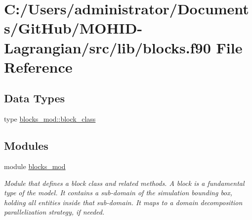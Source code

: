 \hypertarget{blocks_8f90}{}\section{C\+:/\+Users/administrator/\+Documents/\+Git\+Hub/\+M\+O\+H\+I\+D-\/\+Lagrangian/src/lib/blocks.f90 File Reference}
\label{blocks_8f90}
\subsection*{Data Types}
\begin{DoxyCompactItemize}
\item 
type \hyperlink{structblocks__mod_1_1block__class}{blocks\+\_\+mod\+::block\+\_\+class}
\end{DoxyCompactItemize}
\subsection*{Modules}
\begin{DoxyCompactItemize}
\item 
module \hyperlink{namespaceblocks__mod}{blocks\+\_\+mod}
\begin{DoxyCompactList}\small\item\em Module that defines a block class and related methods. A block is a fundamental type of the model. It contains a sub-\/domain of the simulation bounding box, holding all entities inside that sub-\/domain. It maps to a domain decomposition parallelization strategy, if needed. \end{DoxyCompactList}\end{DoxyCompactItemize}
